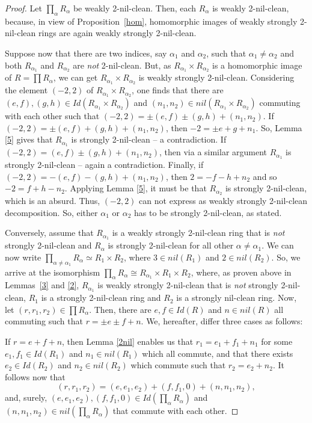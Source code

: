 \documentclass[10pt,a4paper]{amsart}
\begin{document}
\begin{proof} Let $\prod_{\alpha} R_{\alpha}$ be weakly 2-nil-clean. Then, each $R_{\alpha}$ is weakly 2-nil-clean, because, in view of Proposition~\ref{hom}, homomorphic images of weakly strongly 2-nil-clean rings are again weakly strongly 2-nil-clean.

Suppose now that there are two indices, say $\alpha_1$ and $\alpha_2$, such that $\alpha_1\neq \alpha_2$ and both $R_{\alpha_1}$ and $R_{\alpha_2}$ are {\it not} 2-nil-clean. But, as $R_{\alpha_1}\times R_{\alpha_2}$ is a homomorphic image of $R = \prod R_{\alpha}$, we can get $R_{\alpha_1}\times R_{\alpha_2}$ is weakly strongly 2-nil-clean. Considering the element $(-2,2)$ of $R_{\alpha_1}\times R_{\alpha_2}$, one finds that there are $(e,f),(g,h)\in Id(R_{\alpha_1}\times R_{\alpha_2})$ and $(n_1,n_2)\in nil(R_{\alpha_1}\times R_{\alpha_2})$ commuting with each other such that $(-2,2)=\pm(e,f)\pm (g,h)+(n_1,n_2)$. If $(-2,2)=\pm(e,f)+ (g,h)+(n_1,n_2)$, then $-2=\pm e+g+n_1$. So, Lemma \ref{5} gives that $R_{\alpha_1}$ is strongly 2-nil-clean -- a contradiction. If $(-2,2)=(e,f)\pm (g,h)+(n_1,n_2)$, then via a similar argument $R_{\alpha_1}$ is strongly 2-nil-clean -- again a contradiction. Finally, if $(-2,2)=-(e,f)- (g,h)+(n_1,n_2)$, then $2=-f-h+n_2$ and so $-2=f+h-n_2$. Applying Lemma \ref{5}, it must be that $R_{\alpha_2}$ is strongly 2-nil-clean, which is an absurd. Thus, $(-2,2)$ can not express as weakly strongly 2-nil-clean decomposition. So, either $\alpha_1$ or $\alpha_2 $ has to be strongly 2-nil-clean, as stated.

Conversely, assume that $R_{{\alpha}_1}$ is a weakly strongly 2-nil-clean ring that is {\it not} strongly 2-nil-clean and $R_{\alpha}$ is strongly 2-nil-clean for all other $\alpha\neq \alpha_1$. We can now write $\prod_{\alpha\neq \alpha_1} R_{\alpha}\simeq R_1\times R_2$, where $3\in nil(R_1)$ and $2\in nil(R_2)$. So, we arrive at the isomorphism $\prod_{\alpha} R_{\alpha}\cong R_{\alpha_1}\times R_1\times R_2$, where, as proven above in Lemmas~\ref{3} and \ref{2}, $R_{\alpha_1}$ is weakly strongly 2-nil-clean that is {\it not} strongly 2-nil-clean, $R_1$ is a strongly 2-nil-clean ring and $R_2$ is a strongly nil-clean ring. Now, let $(r,r_1,r_2)\in\prod R_{\alpha}$. Then, there are $e,f\in Id(R)$ and $n\in nil(R)$ all commuting such that $r=\pm e\pm f+n$. We, hereafter, differ three cases as follows:

\medskip

 If $r=e+f+n$, then Lemma \ref{2nil} enables us that $r_1=e_1+f_1+n_1$ for some $e_1,f_1\in Id(R_1)$ and $n_1\in nil(R_1)$ which all commute, and that there exists $e_2\in Id(R_2)$ and $n_2\in nil(R_2)$ which commute such that $r_2=e_2+n_2$. It follows now that $$(r,r_1,r_2)=(e,e_1,e_2)+(f,f_1,0)+(n,n_1,n_2),$$ and, surely, $(e,e_1,e_2),(f,f_1,0)\in Id(\prod_{\alpha} R_{\alpha})$ and $(n,n_1,n_2)\in nil(\prod_{\alpha} R_{\alpha})$ that commute with each other.


\end{proof}
\end{document}
